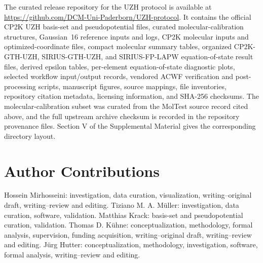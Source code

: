 \documentclass[aps,prb,reprint,amsmath,amssymb,superscriptaddress,longbibliography,floatfix]{revtex4-2}
\begin{document}
The curated release repository for the UZH protocol is available at \url{https://github.com/DCM-Uni-Paderborn/UZH-protocol}. It contains the official CP2K UZH basis-set and pseudopotential files, curated molecular-calibration structures, Gaussian~16 reference inputs and logs, CP2K molecular inputs and optimized-coordinate files, compact molecular summary tables, organized CP2K-GTH-UZH, SIRIUS-GTH-UZH, and SIRIUS-FP-LAPW equation-of-state result files, derived epsilon tables, per-element equation-of-state diagnostic plots, selected workflow input/output records, vendored ACWF verification and post-processing scripts, manuscript figures, source mappings, file inventories, repository citation metadata, licensing information, and SHA-256 checksums. The molecular-calibration subset was curated from the MolTest source record cited above, and the full upstream archive checksum is recorded in the repository provenance files. Section V of the Supplemental Material gives the corresponding directory layout.

\section*{Author Contributions}

Hossein Mirhosseini: investigation, data curation, visualization, writing--original draft, writing--review and editing. Tiziano M. A. M\"uller: investigation, data curation, software, validation. Matthias Krack: basis-set and pseudopotential curation, validation. Thomas D. K\"uhne: conceptualization, methodology, formal analysis, supervision, funding acquisition, writing--original draft, writing--review and editing. J\"urg Hutter: conceptualization, methodology, investigation, software, formal analysis, writing--review and editing.


\end{document}
